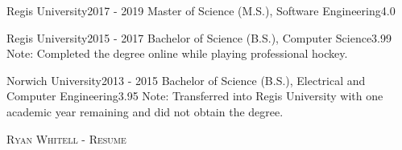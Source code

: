 \documentclass{cv}
\begin{document}
	\begin{education_env}
		\education
		{Regis University}{2017 - 2019}
		{Master of Science (M.S.), Software Engineering}{4.0}
		{}
					
		\education
		{Regis University}{2015 - 2017}
		{Bachelor of Science (B.S.), Computer Science}{3.99}
		{Note: Completed the degree online while playing professional hockey.}

		\education
		{Norwich University}{2013 - 2015}
		{Bachelor of Science (B.S.), Electrical and Computer Engineering}{3.95}
		{Note: Transferred into Regis University with one academic year remaining and did not obtain the degree.}
	\end{education_env}

	\makecvfooter
	{}
	{\textsc{Ryan Whitell - Resume}}
	{}
\end{document}
